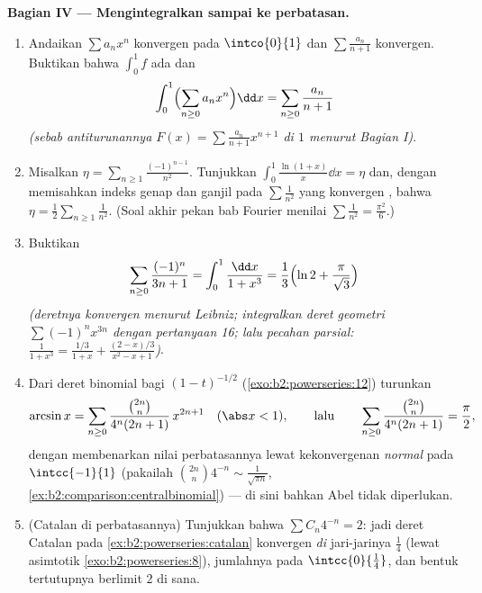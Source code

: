 \begin{problem}
\medskip
\noindent\textbf{Bagian IV --- Mengintegralkan sampai ke perbatasan.}
\begin{enumerate}[resume]
  \item Andaikan $\sum a_nx^n$ konvergen pada $\intco{0}{1}$ dan
        $\sum \frac{a_n}{n+1}$ konvergen. Buktikan bahwa
         $\int_0^1 f$ ada dan
        \[
        \int_0^1 \Bigl(\sum_{n\geq0} a_nx^n\Bigr)\dd x
        = \sum_{n\geq0}\frac{a_n}{n+1}
        \]
        \emph{(sebab antiturunannya $F(x) =
        \sum\frac{a_n}{n+1}x^{n+1}$  di $1$ menurut Bagian I)}.
  \item Misalkan $\eta = \sum_{n\geq1}\frac{(-1)^{n-1}}{n^2}$.
        Tunjukkan $\int_0^1 \frac{\ln(1+x)}{x}\dd x = \eta$ dan,
        dengan memisahkan indeks genap dan ganjil pada $\sum
        \frac1{n^2}$ yang konvergen , bahwa $\eta =
        \frac12\sum_{n\geq1}\frac{1}{n^2}$. (Soal akhir pekan bab
        Fourier menilai $\sum\frac1{n^2} = \frac{\pi^2}{6}$.)
  \item Buktikan
        \[
        \sum_{n\geq0}\frac{(-1)^n}{3n+1}
        = \int_0^1\frac{\dd x}{1+x^3}
        = \frac13\Bigl(\ln 2 + \frac{\pi}{\sqrt3}\Bigr)
        \]
        \emph{(deretnya konvergen menurut Leibniz; integralkan
        deret geometri $\sum(-1)^nx^{3n}$ dengan pertanyaan 16;
        lalu pecahan parsial: $\frac{1}{1+x^3} =
        \frac{1/3}{1+x} + \frac{(2-x)/3}{x^2-x+1}$)}.
  \item Dari deret binomial bagi $(1-t)^{-1/2}$
        (\cref{exo:b2:powerseries:12}) turunkan
        \[
        \arcsin x = \sum_{n\geq0}
        \frac{\binom{2n}{n}}{4^n(2n+1)}\,x^{2n+1}
        \quad(\abs x < 1),
        \qquad\text{lalu}\qquad
        \sum_{n\geq0}\frac{\binom{2n}{n}}{4^n(2n+1)}
        = \frac\pi2 ,
        \]
        dengan membenarkan nilai perbatasannya lewat kekonvergenan
        \emph{normal} pada $\intcc{-1}{1}$ (pakailah
        $\binom{2n}n4^{-n} \sim \frac{1}{\sqrt{\pi n}}$,
        \cref{ex:b2:comparison:centralbinomial}) --- di sini bahkan
        Abel tidak diperlukan.
  \item (Catalan di perbatasannya) Tunjukkan bahwa $\sum C_n 4^{-n} =
        2$: jadi deret Catalan pada
        \cref{ex:b2:powerseries:catalan} konvergen \emph{di}
        jari-jarinya $\frac14$ (lewat asimtotik
        \cref{exo:b2:powerseries:8}), jumlahnya  pada
        $\intcc{0}{\frac14}$, dan bentuk tertutupnya berlimit $2$
        di sana.
\end{enumerate}


\end{problem}
